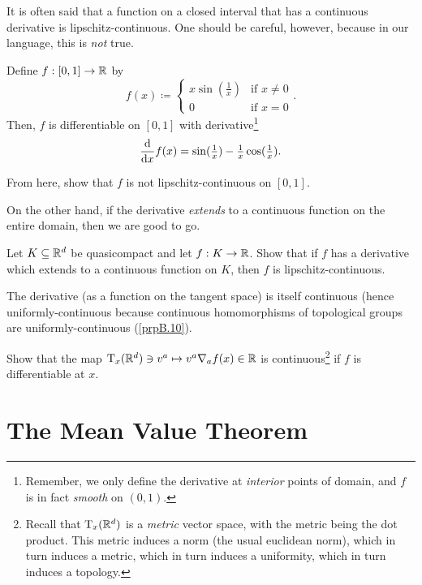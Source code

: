 It is often said that a function on a closed interval that has a continuous derivative is lipschitz-continuous.  One should be careful, however, because in our language, this is \emph{not} true.
\begin{exm}
Define $f:[0,1]\rightarrow \R$ by
\begin{equation}
f(x)\coloneqq \begin{cases}x\sin (\tfrac{1}{x}) & \text{if }x\neq 0 \\ 0 & \text{if }x=0\end{cases}.
\end{equation}
Then, $f$ is differentiable on $[0,1]$ with derivative\footnote{Remember, we only define the derivative at \emph{interior} points of domain, and $f$ is in fact \emph{smooth} on $(0,1)$.}
\begin{equation}
\frac{\dif}{\dif x}f(x)=\sin (\tfrac{1}{x})-\tfrac{1}{x}\cos (\tfrac{1}{x}).
\end{equation}
\begin{exr}
From here, show that $f$ is not lipschitz-continuous on $[0,1]$.
\end{exr}
\end{exm}
On the other hand, if the derivative \emph{extends} to a continuous function on the entire domain, then we are good to go.
\begin{exr}
Let $K\subseteq \R ^d$ be quasicompact and let $f:K\rightarrow \R$.  Show that if $f$ has a derivative which extends to a continuous function on $K$, then $f$ is lipschitz-continuous.
\end{exr}

The derivative (as a function on the tangent space) is itself continuous (hence uniformly-continuous because continuous homomorphisms of topological groups are uniformly-continuous (\cref{prpB.10}).
\begin{exr}
Show that the map $\tangent{\R ^d}{x}\ni v^a\mapsto v^a\nabla _af(x)\in \R$ is continuous\footnote{Recall that $\tangent{\R ^d}{x}$ is a \emph{metric} vector space, with the metric being the dot product.  This metric induces a norm (the usual euclidean norm), which in turn induces a metric, which in turn induces a uniformity, which in turn induces a topology.} if $f$ is differentiable at $x$.
\end{exr}

\section{The Mean Value Theorem}

